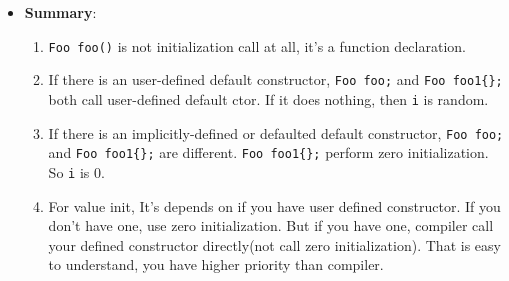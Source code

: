\documentclass[a4paper,11pt,twoside]{book}
\begin{document}
\begin{itemize}
\begin{enumerate}
	\end{enumerate}
		
\item \textbf{Summary}:
\begin{enumerate}
	\item \texttt{Foo foo()} is not initialization call at all, it's a function declaration. 
	
	\item If there is an user-defined default constructor, \texttt{Foo foo;} and \texttt{Foo foo1\{\};} both call user-defined default ctor. If it does nothing, then \texttt{i} is random.
	
	\item If there is an implicitly-defined or defaulted default constructor, \texttt{Foo foo;} and \texttt{Foo foo1\{\};} are different. \texttt{Foo foo1\{\};} perform zero initialization. So \texttt{i} is 0. 
	
	\item For value init, It's depends on if you have user defined constructor. If you don't have one, use zero initialization. But if you have one, compiler call your defined constructor directly(not call zero initialization). That is easy to understand, you have higher priority than compiler. 
\end{enumerate}

\end{itemize}
\end{document}
